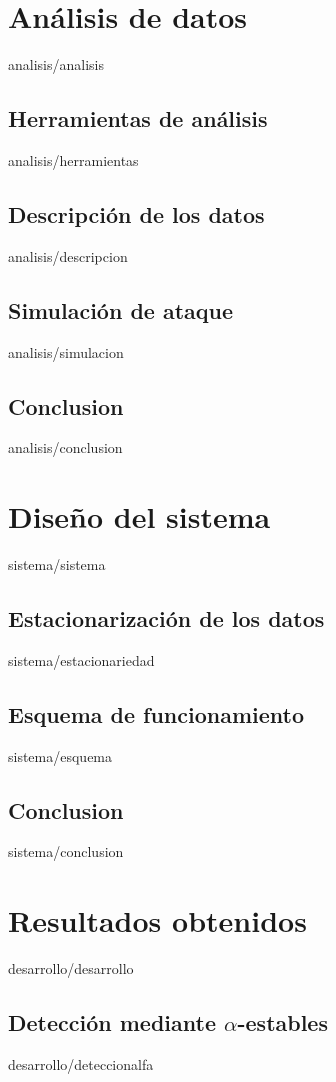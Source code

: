 \documentclass[epsbased,copyright,final,printable,covers,extendedindex,firstnumbered,tfg,gnuplot]{tfgtfmthesisuam}
\begin{document}
\chapter{Análisis de datos\label{CAP:ANALISIS}}{analisis/analisis}
  \section{Herramientas de análisis\label{SEC:HERRAMIENTAS}}{analisis/herramientas}
  \section{Descripción de los datos\label{SEC:DESCRIPCION}}{analisis/descripcion}
  \section{Simulación de ataque\label{SEC:SIMULACION}}{analisis/simulacion}
  \section{Conclusion\label{SEC:ADCONCLUSION}}{analisis/conclusion}

\chapter{Diseño del sistema\label{CAP:SISTEMA}}{sistema/sistema}
  \section{Estacionarización de los datos\label{SEC:ESTACIONARIEDAD}}{sistema/estacionariedad}
  \section{Esquema de funcionamiento\label{SEC:ESQUEMA}}{sistema/esquema}
  \section{Conclusion\label{SEC:SDCONCLUSION}}{sistema/conclusion}

\chapter{Resultados obtenidos\label{CAP:DESARROLLO}}{desarrollo/desarrollo}
\section{Detección mediante $\alpha$-estables\label{SEC:DETECCIONALFA}}{desarrollo/deteccionalfa}
\end{document}
